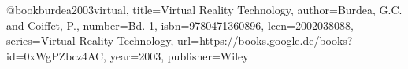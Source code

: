 @book{burdea2003virtual,
  title={Virtual Reality Technology},
  author={Burdea, G.C. and Coiffet, P.},
  number={Bd. 1},
  isbn={9780471360896},
  lccn={2002038088},
  series={Virtual Reality Technology},
  url={https://books.google.de/books?id=0xWgPZbcz4AC},
  year={2003},
  publisher={Wiley}
}
